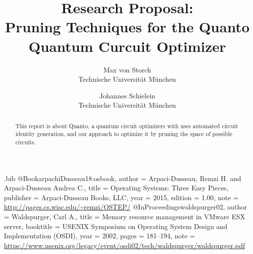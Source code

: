 \usepackage{filecontents}

\begin{filecontents}{\jobname.bib}
@Book{arpachiDusseau18:osbook,
  author =       {Arpaci-Dusseau, Remzi H. and Arpaci-Dusseau Andrea C.},
  title =        {Operating Systems: Three Easy Pieces},
  publisher =    {Arpaci-Dusseau Books, LLC},
  year =         2015,
  edition =      {1.00},
  note =         {\url{http://pages.cs.wisc.edu/~remzi/OSTEP/}}
}
@InProceedings{waldspurger02,
  author =       {Waldspurger, Carl A.},
  title =        {Memory resource management in {VMware ESX} server},
  booktitle =    {USENIX Symposium on Operating System Design and
                  Implementation (OSDI)},
  year =         2002,
  pages =        {181--194},
  note =         {\url{https://www.usenix.org/legacy/event/osdi02/tech/waldspurger/waldspurger.pdf}}}
\end{filecontents}



\date{}

\title{\Large \bf Research Proposal: \\Pruning Techniques for the Quanto Quantum Curcuit Optimizer}

\author{
{\rm Max von Storch}\\
Technische Universität München
\and
{\rm Johannes Schielein}\\
Technische Universität München
} %

\maketitle

\begin{abstract}
This report is about Quanto, a quantum circuit optimizers with uses automated circuit identity generation, and our approach to optimize
it by pruning the space of possible circuits.   
\end{abstract}


